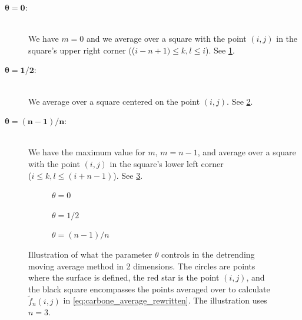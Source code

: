 \begin{description}
    \item[$\bm{\theta = 0}$:] \hfill\\ 
        We have $m=0$ and we average over a square with the point $(i,j)$ in the square's upper right corner (($i-n+1) \leq k,l \leq i$). See \cref{fig:DMA_theta_a}.
    \item[$\bm{\theta = 1/2}$:] \hfill\\ 
        We average over a square centered on the point $(i,j)$. See \cref{fig:DMA_theta_b}.
    \item[$\bm{\theta = (n-1)/n}$:] \hfill\\ 
        {\sloppy 
        We have the maximum value for $m$, $m=n-1$, and average over a square with the point $(i,j)$ in the square's lower left corner \\(${i \leq k,l \leq (i+n-1)}$). See \cref{fig:DMA_theta_c}.
        }
\end{description}

\begin{figure}
    \centering
    \begin{subfigure}[b]{0.25\textwidth}
        
        \caption{$\theta = 0$}
        \label{fig:DMA_theta_a}
    \end{subfigure}
    \hspace{0.1\textwidth}
    \begin{subfigure}[b]{0.25\textwidth}
        
        \caption{$\theta = 1/2$}
        \label{fig:DMA_theta_b}
    \end{subfigure}
    \hspace{0.1\textwidth}
    \begin{subfigure}[b]{0.25\textwidth}
        
        \caption{$\theta = (n-1)/n$}
        \label{fig:DMA_theta_c}
    \end{subfigure}
        \caption{
        Illustration of what the parameter $\theta$ controls in the detrending moving average method in 2 dimensions. The circles are points where the surface is defined, the red star is the point $(i,j)$, and the black square encompasses the points averaged over to calculate $\tilde f_n(i,j)$ in \cref{eq:carbone_average_rewritten}. The illustration uses $n = 3$.
        \label{fig:DMA_theta}
    }
\end{figure}

